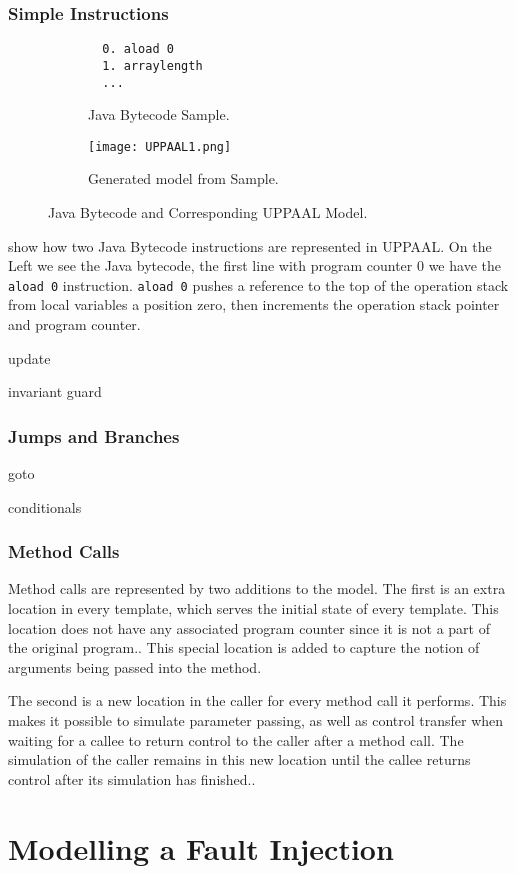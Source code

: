 \subsubsection{Simple Instructions}
\begin{figure}[H]
\centering
\begin{subfigure}{.3\textwidth}
  \begin{lstlisting}
  0. aload 0
  1. arraylength
  ...
  \end{lstlisting}
  \caption{Java Bytecode Sample.}
\end{subfigure} 
\hspace{10px}
\begin{subfigure}{.6\textwidth}
  \texttt{[image: UPPAAL1.png]}
  \caption{Generated model from Sample.}
\end{subfigure}
\caption{Java Bytecode and Corresponding UPPAAL Model.}
\label{fig:uppaal1}
\end{figure}
 show how two Java Bytecode instructions are represented in UPPAAL. On the Left we see the Java bytecode, the first line with program counter 0 we have the \texttt{aload 0} instruction. \texttt{aload 0} pushes a reference to the top of the operation stack from local variables a position zero, then increments the operation stack pointer and program counter.



update

invariant guard

\subsubsection{Jumps and Branches}
goto

conditionals
\subsubsection{Method Calls}
Method calls are represented by two additions to the model. The first is an extra location in every template, which serves the initial state of every template. This location does not have any associated program counter since it is not a part of the original program.. This special location is added to capture the notion of arguments being passed into the method.

The second is a new location in the caller for every method call it performs. This makes it possible to simulate parameter passing, as well as control transfer when waiting for a callee to return control to the caller after a method call. The simulation of the caller remains in this new location until the callee returns control after its simulation has finished..

\section{Modelling a Fault Injection}
